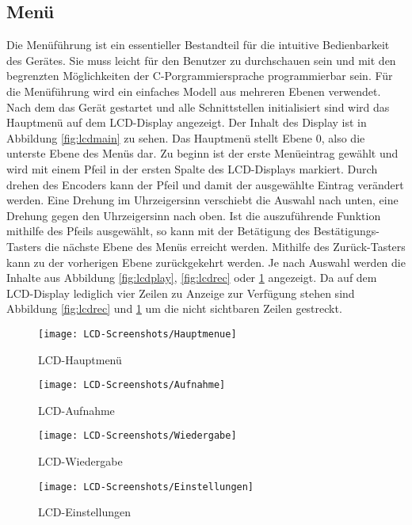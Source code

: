 \subsection{Menü}
Die Menüführung ist ein essentieller Bestandteil für die intuitive Bedienbarkeit des Gerätes. Sie muss leicht für den Benutzer zu durchschauen sein und mit den begrenzten Möglichkeiten der C-Porgrammiersprache programmierbar sein. Für die Menüführung wird ein einfaches Modell aus mehreren Ebenen verwendet. Nach dem das Gerät gestartet und alle Schnittstellen initialisiert sind wird das Hauptmenü auf dem LCD-Display angezeigt. Der Inhalt des Display ist in Abbildung \ref{fig:lcdmain} zu sehen. Das Hauptmenü stellt Ebene 0, also die unterste Ebene des Menüs dar. Zu beginn ist der erste Menüeintrag gewählt und wird mit einem Pfeil in der ersten Spalte des LCD-Displays markiert. Durch drehen des Encoders kann der Pfeil und damit der ausgewählte Eintrag verändert werden. Eine Drehung im Uhrzeigersinn verschiebt die Auswahl nach unten, eine Drehung gegen den Uhrzeigersinn nach oben. Ist die auszuführende Funktion mithilfe des Pfeils ausgewählt, so kann mit der Betätigung des Bestätigungs-Tasters die nächste Ebene des Menüs erreicht werden. Mithilfe des Zurück-Tasters kann zu der vorherigen Ebene zurückgekehrt werden. Je nach Auswahl werden die Inhalte aus Abbildung \ref{fig:lcdplay}, \ref{fig:lcdrec} oder \ref{fig:lcdset} angezeigt. Da auf dem LCD-Display lediglich vier Zeilen zu Anzeige zur Verfügung stehen sind Abbildung \ref{fig:lcdrec} und \ref{fig:lcdset} um die nicht sichtbaren Zeilen gestreckt. 
\begin{figure}[h]
	\begin{minipage}{.22\linewidth}
		\centering
		\texttt{[image: LCD-Screenshots/Hauptmenue]}
		\caption{LCD-Hauptmenü}
		\label{fig:lcdmain}
	\end{minipage}
	\hfill
	\begin{minipage}{.22\linewidth}
		\centering
		\texttt{[image: LCD-Screenshots/Aufnahme]}
		\caption{LCD-Aufnahme}
		\label{fig:lcdrec}
	\end{minipage}
	\hfill
	\begin{minipage}{.22\linewidth}
		\centering
		\texttt{[image: LCD-Screenshots/Wiedergabe]}
		\caption{LCD-Wiedergabe}
		\label{fig:lcdplay}
	\end{minipage}
	\hfill
	\begin{minipage}{.22\linewidth}
		\centering
		\texttt{[image: LCD-Screenshots/Einstellungen]}
		\caption{LCD-Einstellungen}
		\label{fig:lcdset}
	\end{minipage}
\end{figure}
